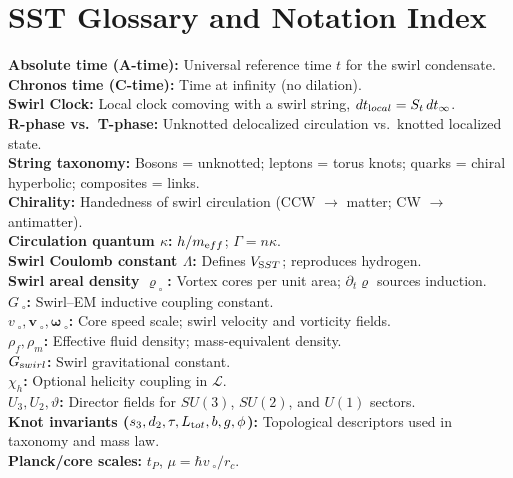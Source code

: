 \documentclass[11pt]{article}
\begin{document}
	\section{SST Glossary and Notation Index}\label{app:glossary}
	\textbf{Absolute time (A-time):} Universal reference time $t$ for the swirl condensate.\\
	\textbf{Chronos time (C-time):} Time at infinity (no dilation).\\
	\textbf{Swirl Clock:} Local clock comoving with a swirl string, $dt_{\textrm local}=S_t\,dt_\infty$.\\
	\textbf{R-phase vs.\ T-phase:} Unknotted delocalized circulation vs.\ knotted localized state.\\
	\textbf{String taxonomy:} Bosons = unknotted; leptons = torus knots; quarks = chiral hyperbolic; composites = links.\\
	\textbf{Chirality:} Handedness of swirl circulation (CCW $\to$ matter; CW $\to$ antimatter).\\
	\textbf{Circulation quantum $\kappa$:} $h/m_{\textrm eff}$; $\Gamma=n\kappa$.\\
	\textbf{Swirl Coulomb constant $\Lambda$:} Defines $V_{\textrm SST}$; reproduces hydrogen.\\
	\textbf{Swirl areal density $\varrho_{\!\!\;\circ}$:} Vortex cores per unit area; $\partial_t\varrho$ sources induction.\\
	\textbf{$G_{\!\!\;\circ}$:} Swirl--EM inductive coupling constant.\\
	\textbf{$v_{\!\!\;\circ}, \mathbf{v}_{\!\!\;\circ}, \boldsymbol{\omega}_{\!\!\;\circ}$:} Core speed scale; swirl velocity and vorticity fields.\\
	\textbf{$\rho_f, \rho_m$:} Effective fluid density; mass-equivalent density.\\
	\textbf{$G_{\textrm swirl}$:} Swirl gravitational constant.\\
	\textbf{$\chi_h$:} Optional helicity coupling in $\mathcal{L}$.\\
	\textbf{$U_3, U_2, \vartheta$:} Director fields for $SU(3)$, $SU(2)$, and $U(1)$ sectors.\\
	\textbf{Knot invariants ($s_3,d_2,\tau,L_{\textrm tot},b,g,\phi$):} Topological descriptors used in taxonomy and mass law.\\
	\textbf{Planck/core scales:} $t_P$, $\mu=\hbar v_{\!\!\;\circ}/r_c$.
\end{document}
